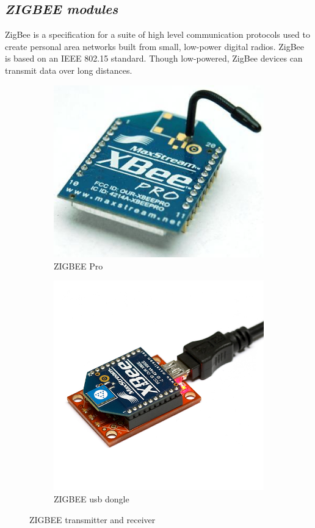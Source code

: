 \documentclass{report}
\begin{document}
\subsection*{\emph{ZIGBEE modules}}
ZigBee is a specification for a suite of high level communication protocols used to create personal area networks built from small, low-power digital radios. ZigBee is based on an IEEE 802.15 standard. Though low-powered, ZigBee devices can transmit data over long distances.
\begin{figure}[h!]

\begin{subfigure}{0.5\textwidth}
	\centering
	\includegraphics[scale=0.25]{fig33a.jpg}
\caption{ZIGBEE Pro}
\end{subfigure}%
%
\begin{subfigure}{0.5\textwidth}
	\centering
	\includegraphics[scale=0.2]{fig33b}
	\caption{ZIGBEE usb dongle}
\end{subfigure}

\caption{ZIGBEE transmitter and receiver}
\label{fig24}
\end{figure} 
\end{document}
